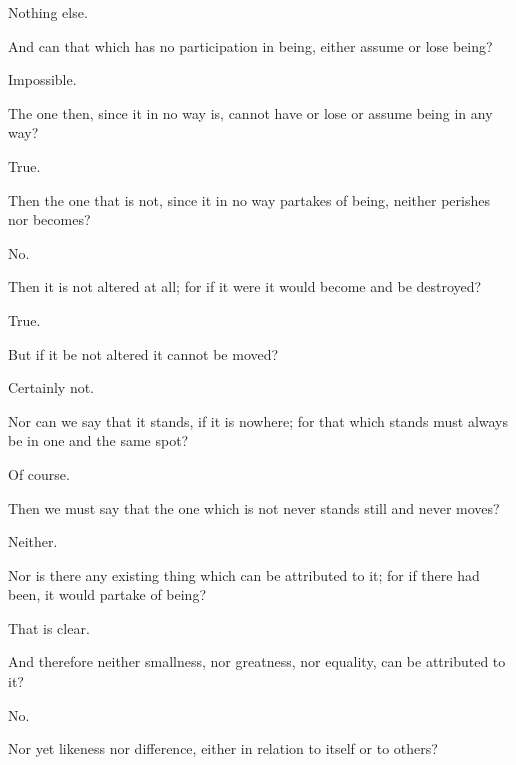 \documentclass[11pt,letter]{article}
\begin{document}
\par  Nothing else.

\par  And can that which has no participation in being, either assume or lose being?

\par  Impossible.

\par  The one then, since it in no way is, cannot have or lose or assume being in any way?

\par  True.

\par  Then the one that is not, since it in no way partakes of being, neither perishes nor becomes?

\par  No.

\par  Then it is not altered at all; for if it were it would become and be destroyed?

\par  True.

\par  But if it be not altered it cannot be moved?

\par  Certainly not.

\par  Nor can we say that it stands, if it is nowhere; for that which stands must always be in one and the same spot?

\par  Of course.

\par  Then we must say that the one which is not never stands still and never moves?

\par  Neither.

\par  Nor is there any existing thing which can be attributed to it; for if there had been, it would partake of being?

\par  That is clear.

\par  And therefore neither smallness, nor greatness, nor equality, can be attributed to it?

\par  No.

\par  Nor yet likeness nor difference, either in relation to itself or to others?
\end{document}
